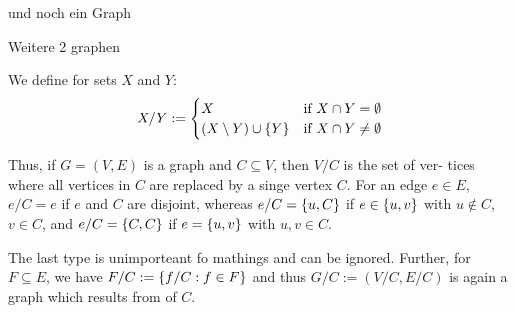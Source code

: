 \begin{xmp+}
und noch ein Graph
\end{xmp+}

\begin{xmp+}
	Weitere 2 graphen
\end{xmp+}

We define for sets $X$ and $Y$: \[
	X/Y:= 
		\begin{cases}
			X & \text{if } X \cap Y=\emptyset \\
			(X\setminus Y) \cup \left\{Y\right\} & \text{if } X \cap Y \neq \emptyset
		\end{cases}
\]

Thus, if $G=(V,E)$ is a graph and $C\subseteq V$, then $V/C$ is the set of ver-
tices where all vertices in $C$ are replaced by a singe vertex $C$.
For an edge $e\in E$, $e/C= e$ if $e$ and $C$ are disjoint, whereas $e/C=
\left\{u,C\right\}$ if $e \in \left\{u,v\right\}$ with $u \not \in C$, $v \in C$, and
$e/C=\left\{C,C\right\}$ if $e = \left\{u,v\right\}$ with $u,v \in C$.

The last type is unimporteant fo mathings and can be ignored. Further, for 
$F \subseteq E$, we have $F/C:= \left\{f/C: f\in F\right\}$ and thus $G/C:=(V/C,E/C)$
is again a graph which results from  of $C$.

